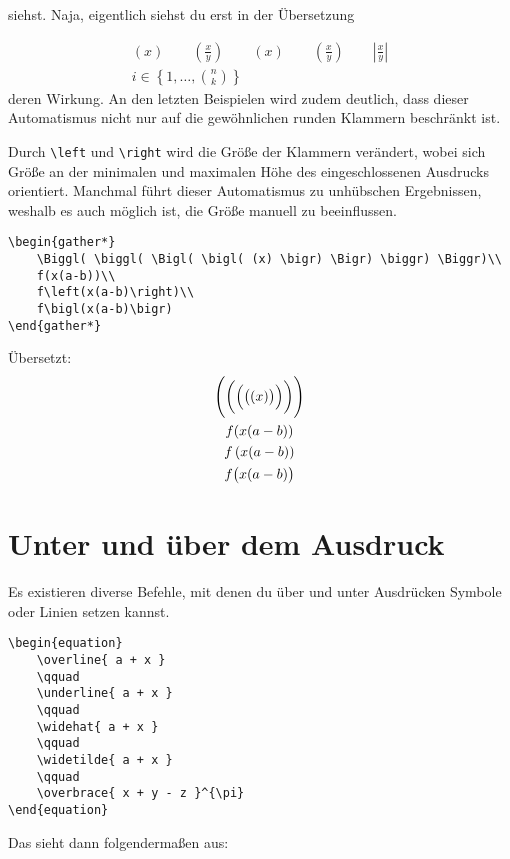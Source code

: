 siehst. Naja, eigentlich siehst du erst in der Übersetzung

\begin{gather*}
	(x)
	\qquad
	(\frac xy)
	\qquad
	\left(x\right)
	\qquad
	\left(\frac xy\right)
	\qquad
	\left\lvert \frac xy \right\rvert\\
	i\in\left\{1,\dotsc,\binom n k\right\}
\end{gather*}
deren Wirkung. An den letzten Beispielen wird zudem deutlich, dass dieser Automatismus nicht nur auf die gewöhnlichen runden Klammern beschränkt ist.

Durch \verb|\left| und \verb|\right| wird die Größe der Klammern verändert, wobei sich Größe an der minimalen und maximalen Höhe des eingeschlossenen Ausdrucks orientiert. Manchmal führt dieser Automatismus zu unhübschen Ergebnissen, weshalb es auch möglich ist, die Größe manuell zu beeinflussen.
\begin{lstlisting}
\begin{gather*}
	\Biggl( \biggl( \Bigl( \bigl( (x) \bigr) \Bigr) \biggr) \Biggr)\\
	f(x(a-b))\\
	f\left(x(a-b)\right)\\
	f\bigl(x(a-b)\bigr)
\end{gather*}
\end{lstlisting} 

Übersetzt:
\begin{gather*}
	\Biggl( \biggl( \Bigl( \bigl( (x) \bigr) \Bigr) \biggr) \Biggr)\\
	f(x(a-b))\\
	f\left(x(a-b)\right)\\
	f\bigl(x(a-b)\bigr)
\end{gather*}

\section{Unter und über dem Ausdruck}

Es existieren diverse Befehle, mit denen du über und unter Ausdrücken Symbole oder Linien setzen kannst.
\begin{lstlisting}
\begin{equation}
	\overline{ a + x }
	\qquad
	\underline{ a + x }
	\qquad
	\widehat{ a + x }
	\qquad
	\widetilde{ a + x }
	\qquad
	\overbrace{ x + y - z }^{\pi}
\end{equation}
\end{lstlisting} 

Das sieht dann folgendermaßen aus:

